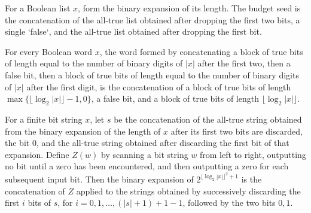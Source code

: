 \begin{definition}
\label{Randomized.budgetSeed}
\leanok
{}
For a Boolean list $x$, form the binary expansion of its length. The budget seed is the
concatenation of the all-true list obtained after dropping the first two bits, a single
`false`, and the all-true list obtained after dropping the first bit.
\end{definition}

\begin{theorem}
\label{Randomized.budgetSeed_eq}
\leanok
{}
For every Boolean word $x$, the word formed by concatenating a block of true bits of
length equal to the number of binary digits of $|x|$ after the first two, then a false
bit, then a block of true bits of length equal to the number of binary digits of $|x|$
after the first digit, is the concatenation of a block of true bits of length
$\max\{\lfloor\log_2 |x|\rfloor-1,0\}$, a false bit, and a block of true bits of length
$\lfloor\log_2 |x|\rfloor$.
\end{theorem}

\begin{theorem}
\label{Randomized.bits_quasiPolyBudget}
\leanok
{}
For a finite bit string $x$, let $s$ be the concatenation of the all-true string
obtained from the binary expansion of the length of $x$ after its first two bits are
discarded, the bit $0$, and the all-true string obtained after discarding the first bit
of that expansion. Define $Z(w)$ by scanning a bit string $w$ from left to right,
outputting no bit until a zero has been encountered, and then outputting a zero for each
subsequent input bit. Then the binary expansion of $2^{\lfloor\log_2 |x|\rfloor^2+1}$ is
the concatenation of $Z$ applied to the strings obtained by successively discarding the
first $i$ bits of $s$, for $i=0,1,\ldots,(|s|+1)+1-1$, followed by the two bits $0,1$.
\end{theorem}

